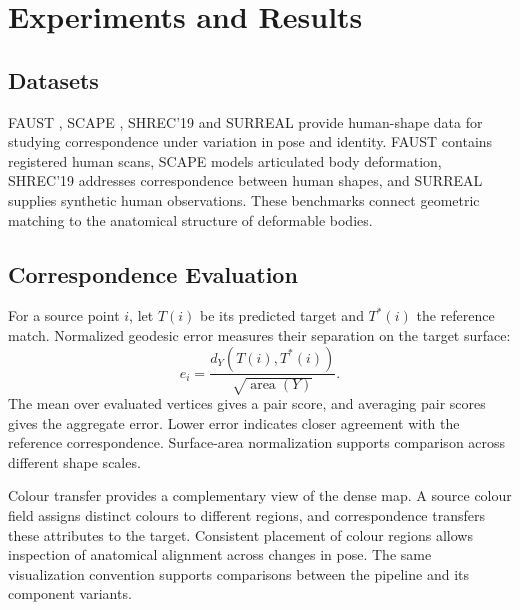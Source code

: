 \chapter{Experiments and Results}
\label{Chapter4}

\section{Datasets}
FAUST \citep{Bogo_2014_FAUST}, SCAPE \citep{10.1145/1186822.1073207}, SHREC'19 \citep{Melzi_2019_SHREC} and SURREAL \citep{Varol_2017_SURREAL} provide human-shape data for studying correspondence under variation in pose and identity. FAUST contains registered human scans, SCAPE models articulated body deformation, SHREC'19 addresses correspondence between human shapes, and SURREAL supplies synthetic human observations. These benchmarks connect geometric matching to the anatomical structure of deformable bodies.

\section{Correspondence Evaluation}
For a source point $i$, let $T(i)$ be its predicted target and $T^*(i)$ the reference match. Normalized geodesic error measures their separation on the target surface:
\begin{equation}
 e_i=\frac{d_Y(T(i),T^*(i))}{\sqrt{\operatorname{area}(Y)}}.
\end{equation}
The mean over evaluated vertices gives a pair score, and averaging pair scores gives the aggregate error. Lower error indicates closer agreement with the reference correspondence. Surface-area normalization supports comparison across different shape scales.

Colour transfer provides a complementary view of the dense map. A source colour field assigns distinct colours to different regions, and correspondence transfers these attributes to the target. Consistent placement of colour regions allows inspection of anatomical alignment across changes in pose. The same visualization convention supports comparisons between the pipeline and its component variants.


